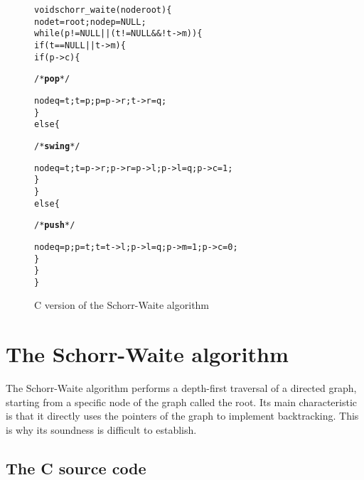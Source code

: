 
\begin{figure*}[t]
\begin{alltt}
void schorr_waite(node root) \{
  node t = root; node p = NULL;
  while (p != NULL || (t != NULL && ! t->m)) \{
    if (t == NULL || t->m) \{
      if (p->c) \{ \begin{slshape}/* \textbf{pop} */\end{slshape}
        node q = t; t = p; p = p->r; t->r = q;
      \} 
      else \{ \begin{slshape}/* \textbf{swing} */\end{slshape}
        node q = t; t = p->r; p->r = p->l; p->l = q; p->c = 1;
      \}
    \} 
    else \{ \begin{slshape}/* \textbf{push} */ \end{slshape}
      node q = p; p = t; t = t->l; p->l = q; p->m = 1; p->c = 0;
    \}
  \}
\}
\end{alltt}
\vspace*{-5mm}
\caption{C version of the Schorr-Waite algorithm}
\label{fig:code}
\end{figure*}

\section{The Schorr-Waite algorithm}
\label{sec:algo}

The Schorr-Waite algorithm performs a depth-first traversal of a
directed graph, starting from a specific node of the graph called the
root. Its main characteristic is that it directly uses the pointers of
the graph to implement backtracking. This is why its soundness is
difficult to establish. 

\subsection{The C source code}


